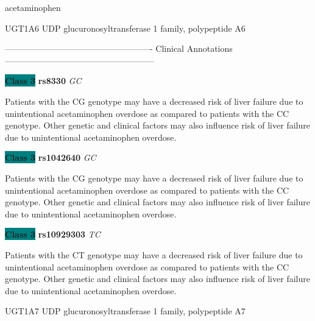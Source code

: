 \documentclass{resume} %
\begin{document}
\begin{rSection}{ acetaminophen }
\begin{rSubsection}{ UGT1A6 }{ UDP glucuronosyltransferase 1 family, polypeptide A6 }{}{}
\item[] ---------------------------------------------------- Clinical Annotations -----------------------------------------------------\newline
\item \textbf{\colorbox{teal} {Class 3}} \textbf{ rs8330 } \textit{ GC }
\item[] Patients with the CG genotype may have a decreased risk of liver failure due to unintentional acetaminophen overdose as compared to patients with the CC genotype. Other genetic and clinical factors may also influence risk of liver failure due to unintentional acetaminophen overdose.\item \textbf{\colorbox{teal} {Class 3}} \textbf{ rs1042640 } \textit{ GC }
\item[] Patients with the CG genotype may have a decreased risk of liver failure due to unintentional acetaminophen overdose as compared to patients with the CC genotype. Other genetic and clinical factors may also influence risk of liver failure due to unintentional acetaminophen overdose.\item \textbf{\colorbox{teal} {Class 3}} \textbf{ rs10929303 } \textit{ TC }
\item[] Patients with the CT genotype may have a decreased risk of liver failure due to unintentional acetaminophen overdose as compared to patients with the CC genotype. Other genetic and clinical factors may also influence risk of liver failure due to unintentional acetaminophen overdose.
\end{rSubsection}\begin{rSubsection}{ UGT1A7 }{ UDP glucuronosyltransferase 1 family, polypeptide A7 }{}{}
\item[]


\end{rSubsection}
\end{rSection}
\end{document}
